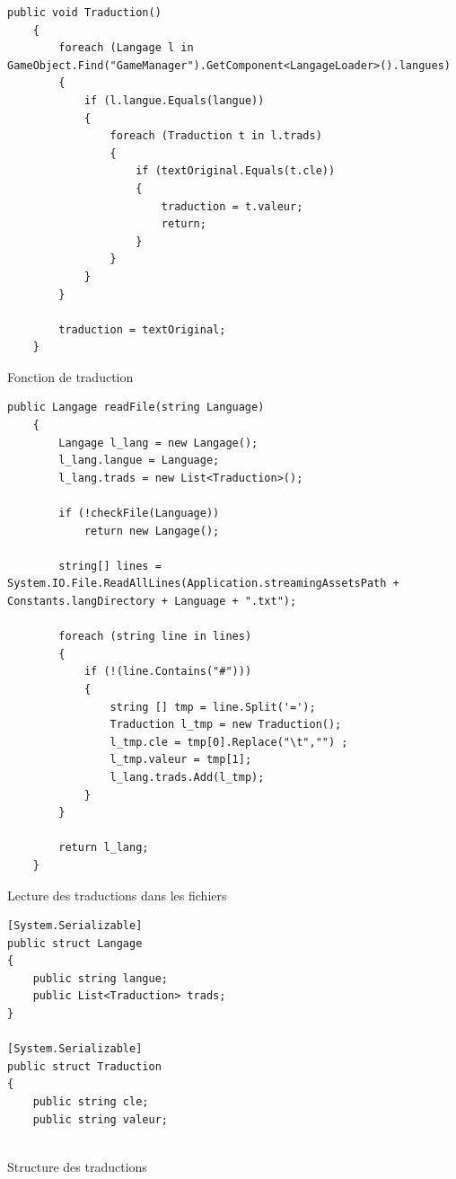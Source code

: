 \documentclass{report}
\begin{document}
\begin{lstlisting}[frame=single]
    public void Traduction()
    {
        foreach (Langage l in GameObject.Find("GameManager").GetComponent<LangageLoader>().langues)
        {
            if (l.langue.Equals(langue))
            {
                foreach (Traduction t in l.trads)
                {
                    if (textOriginal.Equals(t.cle))
                    {
                        traduction = t.valeur;
                        return;
                    }
                }
            }
        }

        traduction = textOriginal;
    }

\end{lstlisting}
 {Fonction de traduction}

\begin{lstlisting}[frame=single]
  public Langage readFile(string Language)
    {
        Langage l_lang = new Langage();
        l_lang.langue = Language;
        l_lang.trads = new List<Traduction>();

        if (!checkFile(Language))
            return new Langage();
            
        string[] lines = System.IO.File.ReadAllLines(Application.streamingAssetsPath + Constants.langDirectory + Language + ".txt");

        foreach (string line in lines)
        {
            if (!(line.Contains("#")))
            {
                string [] tmp = line.Split('=');
                Traduction l_tmp = new Traduction();
                l_tmp.cle = tmp[0].Replace("\t","") ;
                l_tmp.valeur = tmp[1];
                l_lang.trads.Add(l_tmp);
            }
        }

        return l_lang;
    }

\end{lstlisting}
 {Lecture des traductions dans les fichiers}

\begin{lstlisting}[frame=single]
[System.Serializable]
public struct Langage
{
    public string langue;
    public List<Traduction> trads;
}

[System.Serializable]
public struct Traduction
{
    public string cle;
    public string valeur;


\end{lstlisting}
 {Structure des traductions}
\end{document}
